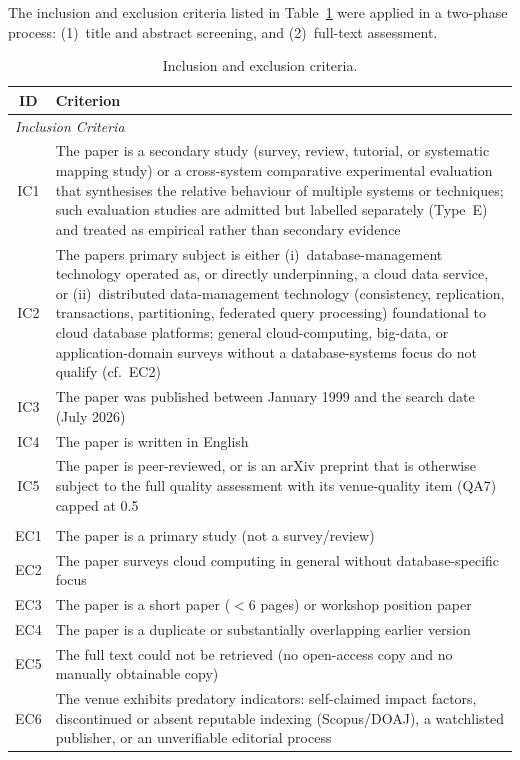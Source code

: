 \documentclass[a4paper,fleqn]{cas-sc}
\begin{document}
The inclusion and exclusion criteria listed in Table~\ref{tab:criteria} were applied in a two-phase process: (1)~title and abstract screening, and (2)~full-text assessment.

\begin{table}[H]
\centering
\caption{Inclusion and exclusion criteria.}
\label{tab:criteria}
\small
\begin{tabular}{c p{10cm}}
\toprule
\textbf{ID} & \textbf{Criterion} \\
\midrule
\multicolumn{2}{l}{\textit{Inclusion Criteria}} \\
IC1 & The paper is a secondary study (survey, review, tutorial, or systematic mapping study) or a cross-system comparative experimental evaluation that synthesises the relative behaviour of multiple systems or techniques; such evaluation studies are admitted but labelled separately (Type~E) and treated as empirical rather than secondary evidence \\
IC2 & The papers primary subject is either (i)~database-management technology operated as, or directly underpinning, a cloud data service, or (ii)~distributed data-management technology (consistency, replication, transactions, partitioning, federated query processing) foundational to cloud database platforms; general cloud-computing, big-data, or application-domain surveys without a database-systems focus do not qualify (cf.\ EC2) \\
IC3 & The paper was published between January 1999 and the search date (July 2026) \\
IC4 & The paper is written in English \\
IC5 & The paper is peer-reviewed, or is an arXiv preprint that is otherwise subject to the full quality assessment with its venue-quality item (QA7) capped at 0.5 \\
\addlinespace
\multicolumn{2}{l}{\textit{Exclusion Criteria}} \\
EC1 & The paper is a primary study (not a survey/review) \\
EC2 & The paper surveys cloud computing in general without database-specific focus \\
EC3 & The paper is a short paper ($<$6 pages) or workshop position paper \\
EC4 & The paper is a duplicate or substantially overlapping earlier version \\
EC5 & The full text could not be retrieved (no open-access copy and no manually obtainable copy) \\
EC6 & The venue exhibits predatory indicators: self-claimed impact factors, discontinued or absent reputable indexing (Scopus/DOAJ), a watchlisted publisher, or an unverifiable editorial process \\
\bottomrule
\end{tabular}
\end{table}
\end{document}
